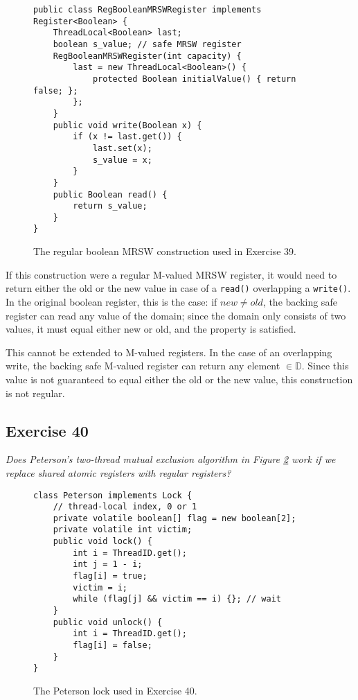 \documentclass[a4paper,10pt]{article}
\begin{document}
\vspace{3mm}

\begin{figure}
\begin{lstlisting}
public class RegBooleanMRSWRegister implements Register<Boolean> {
    ThreadLocal<Boolean> last;
    boolean s_value; // safe MRSW register
    RegBooleanMRSWRegister(int capacity) {
        last = new ThreadLocal<Boolean>() {
            protected Boolean initialValue() { return false; };
        };
    }
    public void write(Boolean x) {
        if (x != last.get()) {
            last.set(x);
            s_value = x;
        }
    }
    public Boolean read() {
        return s_value;
    }
}
\end{lstlisting}
\caption{The regular boolean MRSW construction used in Exercise 39.}
\label{fig:regularbooleanmrsw}
\end{figure}

If this construction were a regular M-valued MRSW register, it would need
to return either the old or the new value in case of a \lstinline|read()| overlapping
a \lstinline|write()|. In the original boolean register, this is the case: if $new \neq old$,
the backing safe register can read any value of the domain; since the domain only
consists of two values, it must equal either new or old, and the property is satisfied.

This cannot be extended to M-valued registers. In the case of an overlapping write,
the backing safe M-valued register can return any element $\in \mathbb{D}$. Since this
value is not guaranteed to equal either the old or the new value, this construction is
not regular.


\subsection{Exercise 40}

\emph{Does Peterson’s two-thread mutual exclusion algorithm in Figure \ref{fig:peterson}
work if we replace shared atomic registers with regular registers?}

\vspace{3mm}

\begin{figure}
\begin{lstlisting}
class Peterson implements Lock {
    // thread-local index, 0 or 1
    private volatile boolean[] flag = new boolean[2];
    private volatile int victim;
    public void lock() {
        int i = ThreadID.get();
        int j = 1 - i;
        flag[i] = true;
        victim = i;
        while (flag[j] && victim == i) {}; // wait
    }
    public void unlock() {
        int i = ThreadID.get();
        flag[i] = false;
    }
}
\end{lstlisting}
\caption{The Peterson lock used in Exercise 40.}
\label{fig:peterson}
\end{figure}
\end{document}
